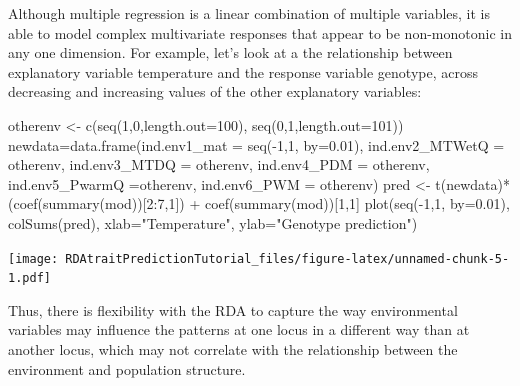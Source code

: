 \documentclass[
]{article}
\newenvironment{Shaded}{\begin{snugshade}}{\end{snugshade}}
\newcommand{\AttributeTok}[1]{\textcolor[rgb]{0.77,0.63,0.00}{#1}}
\newcommand{\DecValTok}[1]{\textcolor[rgb]{0.00,0.00,0.81}{#1}}
\newcommand{\FloatTok}[1]{\textcolor[rgb]{0.00,0.00,0.81}{#1}}
\newcommand{\FunctionTok}[1]{\textcolor[rgb]{0.00,0.00,0.00}{#1}}
\newcommand{\NormalTok}[1]{#1}
\newcommand{\OtherTok}[1]{\textcolor[rgb]{0.56,0.35,0.01}{#1}}
\newcommand{\SpecialCharTok}[1]{\textcolor[rgb]{0.00,0.00,0.00}{#1}}
\newcommand{\StringTok}[1]{\textcolor[rgb]{0.31,0.60,0.02}{#1}}
\begin{document}
Although multiple regression is a linear combination of multiple
variables, it is able to model complex multivariate responses that
appear to be non-monotonic in any one dimension. For example, let's look
at a the relationship between explanatory variable temperature and the
response variable genotype, across decreasing and increasing values of
the other explanatory variables:

\begin{Shaded}
\begin{Highlighting}[]
\NormalTok{otherenv }\OtherTok{\textless{}{-}} \FunctionTok{c}\NormalTok{(}\FunctionTok{seq}\NormalTok{(}\DecValTok{1}\NormalTok{,}\DecValTok{0}\NormalTok{,}\AttributeTok{length.out=}\DecValTok{100}\NormalTok{), }\FunctionTok{seq}\NormalTok{(}\DecValTok{0}\NormalTok{,}\DecValTok{1}\NormalTok{,}\AttributeTok{length.out=}\DecValTok{101}\NormalTok{))}
\NormalTok{newdata}\OtherTok{=}\FunctionTok{data.frame}\NormalTok{(}\AttributeTok{ind.env1\_mat =} \FunctionTok{seq}\NormalTok{(}\SpecialCharTok{{-}}\DecValTok{1}\NormalTok{,}\DecValTok{1}\NormalTok{, }\AttributeTok{by=}\FloatTok{0.01}\NormalTok{),}
                   \AttributeTok{ind.env2\_MTWetQ =}\NormalTok{ otherenv,}
                   \AttributeTok{ind.env3\_MTDQ =}\NormalTok{ otherenv,}
                   \AttributeTok{ind.env4\_PDM =}\NormalTok{ otherenv,}
                   \AttributeTok{ind.env5\_PwarmQ =}\NormalTok{otherenv,}
                   \AttributeTok{ind.env6\_PWM =}\NormalTok{ otherenv)}
\NormalTok{pred }\OtherTok{\textless{}{-}} \FunctionTok{t}\NormalTok{(newdata)}\SpecialCharTok{*}\NormalTok{(}\FunctionTok{coef}\NormalTok{(}\FunctionTok{summary}\NormalTok{(mod))[}\DecValTok{2}\SpecialCharTok{:}\DecValTok{7}\NormalTok{,}\DecValTok{1}\NormalTok{]) }\SpecialCharTok{+} \FunctionTok{coef}\NormalTok{(}\FunctionTok{summary}\NormalTok{(mod))[}\DecValTok{1}\NormalTok{,}\DecValTok{1}\NormalTok{]}
\FunctionTok{plot}\NormalTok{(}\FunctionTok{seq}\NormalTok{(}\SpecialCharTok{{-}}\DecValTok{1}\NormalTok{,}\DecValTok{1}\NormalTok{, }\AttributeTok{by=}\FloatTok{0.01}\NormalTok{), }\FunctionTok{colSums}\NormalTok{(pred), }\AttributeTok{xlab=}\StringTok{"Temperature"}\NormalTok{, }\AttributeTok{ylab=}\StringTok{"Genotype prediction"}\NormalTok{)}
\end{Highlighting}
\end{Shaded}

\texttt{[image: RDAtraitPredictionTutorial\_files/figure-latex/unnamed-chunk-5-1.pdf]}

Thus, there is flexibility with the RDA to capture the way environmental
variables may influence the patterns at one locus in a different way
than at another locus, which may not correlate with the relationship
between the environment and population structure.
\end{document}

